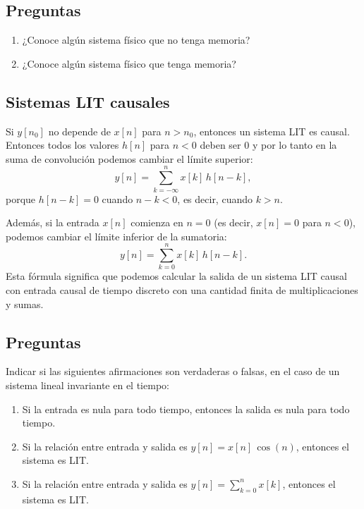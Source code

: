 \subsection{Preguntas}

\begin{enumerate}
	\item ¿Conoce algún sistema físico que no tenga memoria?
	\item ¿Conoce algún sistema físico que tenga memoria?
\end{enumerate}

\subsection{Sistemas LIT causales}

Si $y[n_{0}]$ no depende de $x[n]$ para $n > n_{0}$, entonces un sistema LIT es causal. Entonces todos los valores $h[n]$ para $n < 0$ deben ser $0$ y por lo tanto en la suma de convolución podemos cambiar el límite superior:
\begin{equation}
	y[n] = \sum_{k=-\infty}^{n} x[k] \, h[n-k],
\end{equation}
porque $h[n-k] = 0$ cuando $n - k < 0$, es decir, cuando $k > n$.

Además, si la entrada $x[n]$ comienza en $n = 0$ (es decir, $x[n]=0$ para $n<0$), podemos cambiar el límite inferior de la sumatoria:
\begin{equation}
	y[n] = \sum_{k=0}^{n} x[k] \, h[n-k].
\end{equation}
Esta fórmula significa que podemos calcular la salida de un sistema LIT causal con entrada causal de tiempo discreto con una cantidad finita de multiplicaciones y sumas.

\subsection{Preguntas}

Indicar si las siguientes afirmaciones son verdaderas o falsas, en el caso de un sistema lineal invariante en el tiempo:

\begin{enumerate}
	\item Si la entrada es nula para todo tiempo, entonces la salida es nula para todo tiempo.
	\item Si la relación entre entrada y salida es $y[n] = x[n] \, \cos(n)$, entonces el sistema es LIT.
	\item Si la relación entre entrada y salida es $y[n] = \sum_{k=0}^{n} x[k]$, entonces el sistema es LIT.
\end{enumerate}

